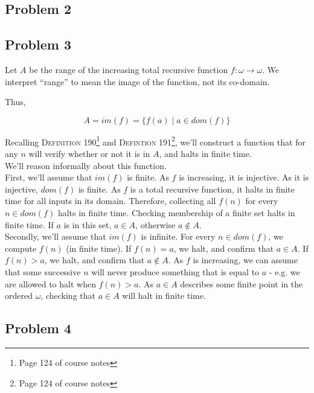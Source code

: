 \documentclass[a4paper]{article}
\newcommand{\SET}[1]{\{ {#1} \}}
\begin{document}
\subsection*{Problem 2}

    \begin{prooftree}
    \end{prooftree}


\subsection*{Problem 3}

Let $A$ be the range of the increasing total recursive function $f: \omega \rightarrow \omega$. We interpret ``range'' to mean the image of the function, not its co-domain.

Thus,

\[
    A = im(f) = \SET{ f(a) \mid a \in dom(f) }
\]

Recalling \textsc{Definition 190}\footnote{Page 124 of course notes} and \textsc{Defintion 191}\footnote{Page 124 of course notes}, we'll construct a function that for any $n$ will verify whether or not it is in $A$, and halts in finite time. \\

We'll reason informally about this function.\\

First, we'll assume that $im(f)$ is finite. As $f$ is increasing, it is injective. As it is injective, $dom(f)$ is finite. As $f$ is a total recursive function, it halts in finite time for all inputs in its domain. Therefore, collecting all $f(n)$ for every $n \in dom(f)$ halts in finite time. Checking membership of a finite set halts in finite time. If $a$ is in this set, $a \in A$, otherwise $a \not\in A$.\\

Secondly, we'll assume that $im(f)$ is infinite. For every $n \in dom(f)$, we compute $f(n)$ (in finite time). If $f(n) = a$, we halt, and confirm that $a \in A$. If $f(n) > a$, we halt, and confirm that $a \not\in A$. As $f$ is increasing, we can assume that some successive $n$ will never produce something that is equal to $a$ - e.g. we are allowed to halt when $f(n) > a$. As $a \in A$ describes some finite point in the ordered $\omega$, checking that $a \in A$ will halt in finite time.


\subsection*{Problem 4}
\end{document}
